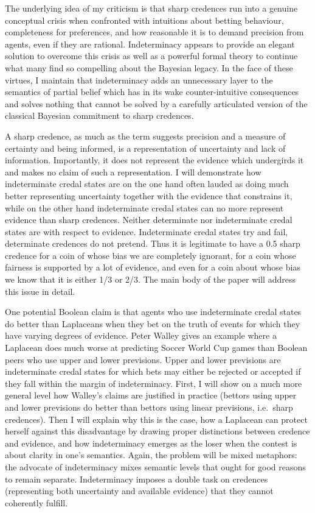 The underlying idea of my criticism is that sharp credences run into a genuine conceptual crisis when confronted with intuitions about betting behaviour, completeness for preferences, and how reasonable it is to demand precision from agents, even if they are rational. Indeterminacy appears to provide an elegant solution to overcome this crisis as well as a powerful formal theory to continue what many find so compelling about the Bayesian legacy. In the face of these virtues, I maintain that indeterminacy adds an unnecessary layer to the semantics of partial belief which has in its wake counter-intuitive consequences and solves nothing that cannot be solved by a carefully articulated version of the classical Bayesian commitment to sharp credences.

A sharp credence, as much as the term suggests precision and a measure of certainty and being informed, is a representation of uncertainty and lack of information. Importantly, it does not represent the evidence which undergirds it and makes no claim of such a representation. I will demonstrate how indeterminate credal states are on the one hand often lauded as doing much better representing uncertainty together with the evidence that constrains it, while on the other hand indeterminate credal states can no more represent evidence than sharp credences. Neither determinate nor indeterminate credal states are  with respect to evidence. Indeterminate credal states try and fail, determinate credences do not pretend. Thus it is legitimate to have a 0.5 sharp credence for a coin of whose bias we are completely ignorant, for a coin whose fairness is supported by a lot of evidence, and even for a coin about whose bias we know that it is either 1/3 or 2/3. The main body of the paper will address this issue in detail.

One potential Boolean claim is that agents who use indeterminate credal states do better than Laplaceans when they bet on the truth of events for which they have varying degrees of evidence. Peter Walley gives an example where a Laplacean does much worse at predicting Soccer World Cup games than Boolean peers who use upper and lower previsions. Upper and lower previsions are indeterminate credal states for which bets may either be rejected or accepted if they fall within the margin of indeterminacy. First, I will show on a much more general level how Walley's claims are justified in practice (bettors using upper and lower previsions do better than bettors using linear previsions, i.e.\ sharp credences). Then I will explain why this is the case, how a Laplacean can protect herself against this disadvantage by drawing proper distinctions between credence and evidence, and how indeterminacy emerges as the loser when the contest is about clarity in one's semantics. Again, the problem will be mixed metaphors: the advocate of indeterminacy mixes semantic levels that ought for good reasons to remain separate. Indeterminacy imposes a double task on credences (representing both uncertainty and available evidence) that they cannot coherently fulfill.

